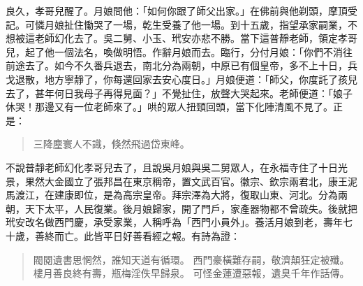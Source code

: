 良久，孝哥兒醒了。月娘問他：「如何你跟了師父出家。」在佛前與他剃頭，摩頂受記。可憐月娘扯住慟哭了一場，乾生受養了他一場。到十五歲，指望承家嗣業，不想被這老師幻化去了。吳二舅、小玉、玳安亦悲不勝。當下這普靜老師，領定孝哥兒，起了他一個法名，喚做明悟。作辭月娘而去。臨行，分付月娘：「你們不消往前途去了。如今不久番兵退去，南北分為兩朝，中原已有個皇帝，多不上十日，兵戈退散，地方寧靜了，你每還回家去安心度日。」月娘便道：「師父，你度託了孩兒去了，甚年何日我母子再得見面？」不覺扯住，放聲大哭起來。老師便道：「娘子休哭！那邊又有一位老師來了。」哄的眾人扭頸回頭，當下化陣清風不見了。正是：
\begin{quote}
三降塵寰人不識，倏然飛過岱東峰。
\end{quote}

不說普靜老師幻化孝哥兒去了，且說吳月娘與吳二舅眾人，在永福寺住了十日光景，果然大金國立了張邦昌在東京稱帝，置文武百官。徽宗、欽宗兩君北，康王泥馬渡江，在建康即位，是為高宗皇帝。拜宗澤為大將，復取山東、河北。分為兩朝，天下太平，人民復業。後月娘歸家，開了門戶，家產器物都不曾疏失。後就把玳安改名做西門慶，承受家業，人稱呼為「西門小員外」。養活月娘到老，壽年七十歲，善終而亡。此皆平日好善看經之報。有詩為證：
\begin{quote}
閥閱遺書思惘然，誰知天道有循環。
西門豪橫難存嗣，敬濟顛狂定被殲。
樓月善良終有壽，瓶梅淫佚早歸泉。
可怪金蓮遭惡報，遺臭千年作話傳。
\end{quote}
